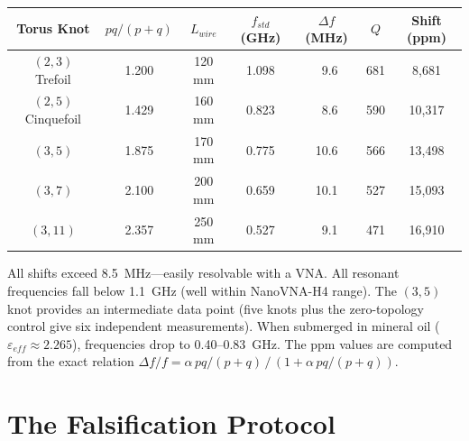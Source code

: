 \begin{center}
\begin{tabular}{|c|c|c|c|c|c|c|}
\hline
Torus Knot & $pq/(p{+}q)$ & $L_{wire}$ & $f_{std}$ (GHz) & $\Delta f$ (MHz) & $Q$ & Shift (ppm) \\ \hline
$(2,3)$ Trefoil    & 1.200 & 120 mm & 1.098 & $\phantom{0}$9.6 & 681 & 8{,}681  \\
$(2,5)$ Cinquefoil & 1.429 & 160 mm & 0.823 & $\phantom{0}$8.6 & 590 & 10{,}317 \\
$(3,5)$            & 1.875 & 170 mm & 0.775 & 10.6 & 566 & 13{,}498 \\
$(3,7)$            & 2.100 & 200 mm & 0.659 & 10.1 & 527 & 15{,}093 \\
$(3,11)$           & 2.357 & 250 mm & 0.527 & $\phantom{0}$9.1 & 471 & 16{,}910 \\ \hline
\end{tabular}
\end{center}

All shifts exceed 8.5~MHz---easily resolvable with a VNA. All resonant frequencies fall below 1.1~GHz (well within NanoVNA-H4 range). The $(3,5)$ knot provides an intermediate data point (five knots plus the zero-topology control give six independent measurements). When submerged in mineral oil ($\varepsilon_{eff} \approx 2.265$), frequencies drop to 0.40--0.83~GHz. The ppm values are computed from the exact relation $\Delta f/f = \alpha\,pq/(p{+}q)\,/\,(1 + \alpha\,pq/(p{+}q))$.

\section{The Falsification Protocol}

